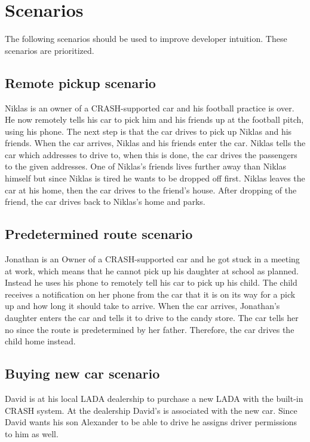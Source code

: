 \documentclass{article}
\begin{document}
\section{Scenarios}
The following scenarios should be used to improve developer intuition. These scenarios are prioritized.
\subsection {Remote pickup scenario}
Niklas is an owner of a CRASH-supported car and his football practice is over. He now remotely tells his car to pick him and his friends up at the football pitch, using his phone. The next step is that the car drives to pick up Niklas and his friends. When the car arrives, Niklas and his friends enter the car. Niklas tells the car which addresses to drive to, when this is done, the car drives the passengers to the given addresses. One of Niklas's friends lives further away than Niklas himself but since Niklas is tired he wants to be dropped off first. Niklas leaves the car at his home, then the car drives to the friend's house. After dropping of the friend, the car drives back to Niklas's home and parks.

\subsection {Predetermined route scenario}
Jonathan is an Owner of a CRASH-supported car and he got stuck in a meeting at work, which means that he cannot pick up his daughter at school as planned. Instead he uses his phone to remotely tell his car to pick up his child. The child receives a notification on her phone from the car that it is on its way for a pick up and how long it should take to arrive. When the car arrives, Jonathan’s daughter enters the car and tells it to drive to the candy store. The car tells her no since the route is predetermined by her father. Therefore, the car drives the child home instead.

\subsection {Buying new car scenario}
David is at his local LADA dealership to purchase a new LADA with the built-in CRASH system. At the dealership David’s is associated with the new car. Since David wants his son Alexander to be able to drive he assigns driver permissions to him as well.
\end{document}
